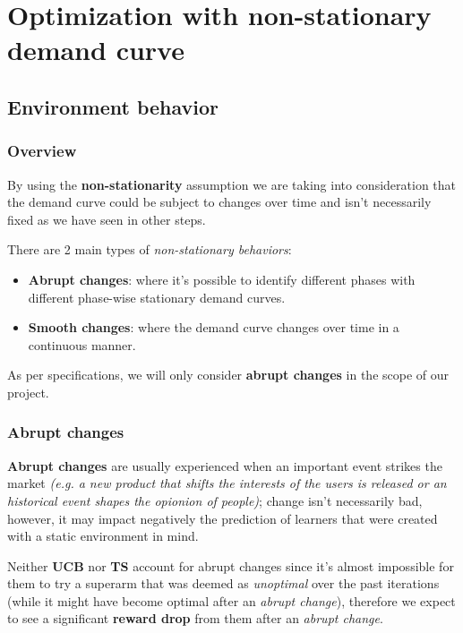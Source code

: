 \chapter{Optimization with non-stationary demand curve}
\label{chap:ns_demand}

\section{Environment behavior}

\subsection{Overview}

By using the \textbf{non-stationarity} assumption we are taking into consideration that the demand curve could be subject to changes over time and isn't necessarily fixed as we have seen in other steps.

There are 2 main types of \textit{non-stationary behaviors}:
\begin{itemize}
    \item \textbf{Abrupt changes}: where it's possible to identify different phases with different phase-wise stationary demand curves.
    \item \textbf{Smooth changes}: where the demand curve changes over time in a continuous manner.
\end{itemize}

As per specifications, we will only consider \textbf{abrupt changes} in the scope of our project.

\subsection{Abrupt changes}

\textbf{Abrupt changes} are usually experienced when an important event strikes the market \textit{(e.g. a new product that shifts the interests of the users is released or an historical event shapes the opionion of people)}; change isn't necessarily bad, however, it may impact negatively the prediction of learners that were created with a static environment in mind.

Neither \textbf{UCB} nor \textbf{TS} account for abrupt changes since it's almost impossible for them to try a superarm that was deemed as \textit{unoptimal} over the past iterations (while it might have become optimal after an \textit{abrupt change}), therefore we expect to see a significant \textbf{reward drop} from them after an \textit{abrupt change}.

